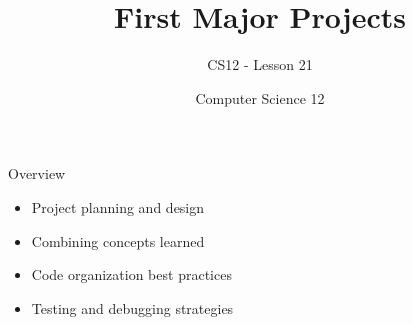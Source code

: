 \documentclass[10pt]{beamer}
\title{First Major Projects}
\subtitle{CS12 - Lesson 21}
\author{Computer Science 12}
\date{}
\begin{document}
\begin{frame}
    \titlepage
\end{frame}

\begin{frame}{Overview}
    \begin{itemize}
        \item Project planning and design
        \item Combining concepts learned
        \item Code organization best practices
        \item Testing and debugging strategies
    \end{itemize}
\end{frame}

\end{document}
